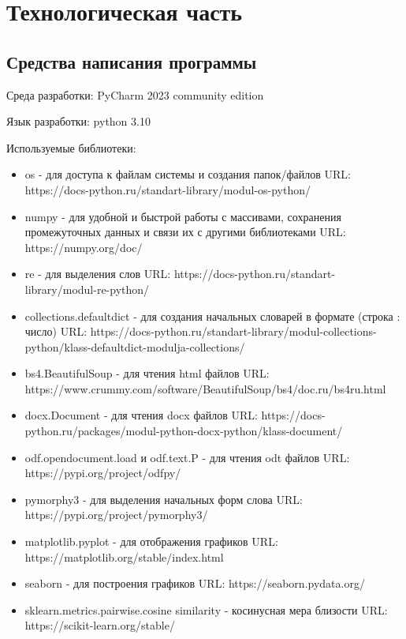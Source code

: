 \chapter{Технологическая часть}

\section{Средства написания программы}

Среда разработки: PyCharm 2023 community edition

Язык разработки: python 3.10
	
Используемые библиотеки:
\begin{itemize}
    \item 
    os - для доступа к файлам системы и создания папок/файлов
    URL: https://docs-python.ru/standart-library/modul-os-python/
    \item 
    numpy - для удобной и быстрой работы с массивами, сохранения промежуточных данных и связи их с другими библиотеками
    URL: https://numpy.org/doc/
    \item 
    re - для выделения слов
    URL: https://docs-python.ru/standart-library/modul-re-python/
    \item 
    collections.defaultdict - для создания начальных словарей в формате (строка : число)
    URL: https://docs-python.ru/standart-library/modul-collections-python/klass-defaultdict-modulja-collections/
    \item 
    bs4.BeautifulSoup - для чтения html файлов
    URL: https://www.crummy.com/software/BeautifulSoup/bs4/doc.ru/bs4ru.html
    \item 
    docx.Document - для чтения docx файлов
    URL: https://docs-python.ru/packages/modul-python-docx-python/klass-document/
    \item 
    odf.opendocument.load и odf.text.P - для чтения odt файлов
    URL: https://pypi.org/project/odfpy/
    \item 
    pymorphy3 - для выделения начальных форм слова
    URL: https://pypi.org/project/pymorphy3/
    \item 
    matplotlib.pyplot - для отображения графиков
    URL: https://matplotlib.org/stable/index.html
    \item 
    seaborn - для построения графиков
    URL: https://seaborn.pydata.org/
    \item 
    sklearn.metrics.pairwise.cosine similarity - косинусная мера близости
    URL: https://scikit-learn.org/stable/
\end{itemize}

